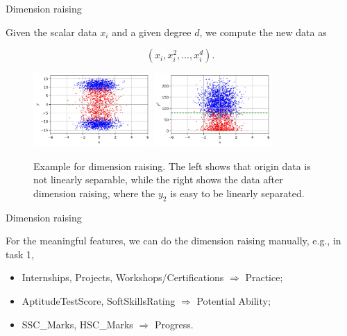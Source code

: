 \documentclass{beamer}
\begin{document}
\begin{frame}{Dimension raising}

  Given the scalar data $x_i$ and a given degree $d$, we compute the new data as

  $$
    (x_i, x_i^2, \dots, x_i^d).
  $$

  \begin{figure}[H]
    \centering
    \includegraphics[width=0.4\textwidth]{./figure/Sample-Raising-1.jpg}
    \includegraphics[width=0.4\textwidth]{./figure/Sample-Raising-2.jpg}
    \caption{Example for dimension raising. The left shows that origin data is not linearly separable, while the right shows the data after dimension raising, where the $y_2$ is easy to be linearly separated.}
  \end{figure}

\end{frame}

\begin{frame}{Dimension raising}

  For the meaningful features, we can do the dimension raising manually, e.g., in task 1, \vspace{.25cm}

  \begin{itemize}
    \item Internships, Projects, Workshops/Certifications $\Longrightarrow$ Practice; \vspace{.25cm}
    \item AptitudeTestScore, SoftSkillsRating $\Longrightarrow$ Potential Ability; \vspace{.25cm}
    \item SSC\_Marks, HSC\_Marks $\Longrightarrow$ Progress. \vspace{.25cm}
  \end{itemize}

\end{frame}
\end{document}
